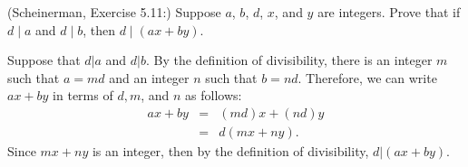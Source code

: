\documentclass{article}
\theoremstyle{definition}
\begin{document}
\begin{question}
    (Scheinerman, Exercise 5.11:)
    Suppose $a$, $b$, $d$, $x$, and $y$ are integers.
    Prove that if $d \mid a$ and $d\mid b$,
    then $d \mid (ax+by)$.
\end{question}
\begin{solution}
Suppose that $d|a$ and $d|b$.  By the definition of divisibility, there is an integer $m$ such that $a = md$ and an integer $n$ such that $b = nd$.  Therefore, we can write $ax + by$ in terms of $d, m$, and $n$ as follows:
\begin{eqnarray*} 
ax + by & = & (md)x + (nd)y \\
	& = & d(mx + ny).
\end{eqnarray*}
Since $mx + ny$ is an integer, then by the definition of divisibility, $d | (ax + by)$.\\
\end{solution}
\end{document}
